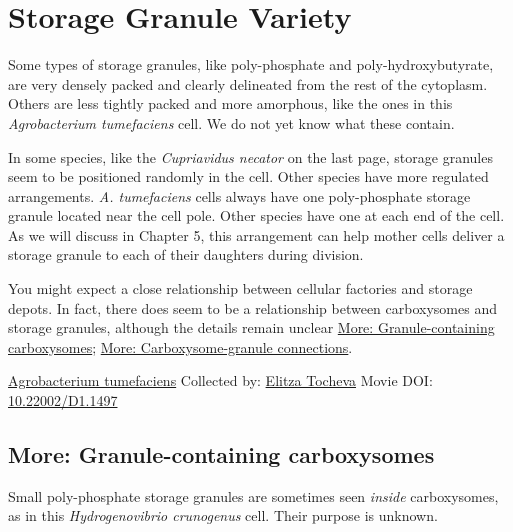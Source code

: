 \documentclass[]{tufte-book}
\begin{document}
\hypertarget{storage-granule-variety}{%
\section{Storage Granule Variety}\label{storage-granule-variety}}

Some types of storage granules, like poly-phosphate and poly-hydroxybutyrate, are very densely packed and clearly delineated from the rest of the cytoplasm. Others are less tightly packed and more amorphous, like the ones in this \emph{Agrobacterium tumefaciens} cell. We do not yet know what these contain.

In some species, like the \emph{Cupriavidus necator} on the last page, storage granules seem to be positioned randomly in the cell. Other species have more regulated arrangements. \emph{A. tumefaciens} cells always have one poly-phosphate storage granule located near the cell pole. Other species have one at each end of the cell. As we will discuss in Chapter 5, this arrangement can help mother cells deliver a storage granule to each of their daughters during division.

You might expect a close relationship between cellular factories and storage depots. In fact, there does seem to be a relationship between carboxysomes and storage granules, although the details remain unclear \protect\hyperlink{Granule-containing_carboxysomes}{More: Granule-containing carboxysomes}; \protect\hyperlink{Carboxysome-granule_connections}{More: Carboxysome-granule connections}.



\hypertarget{htmlwidget-04189289d62ad39fd099}{}

\label{fig:4-9}\protect\hyperlink{tree}{Agrobacterium tumefaciens} Collected by: \protect\hyperlink{elitza_tocheva}{Elitza Tocheva} Movie DOI: \href{https://doi.org/10.22002/D1.1497}{10.22002/D1.1497}

\hypertarget{Granule-containing_carboxysomes}{%
\subsection*{More: Granule-containing carboxysomes}\label{Granule-containing_carboxysomes}}

Small poly-phosphate storage granules are sometimes seen \emph{inside} carboxysomes, as in this \emph{Hydrogenovibrio crunogenus} cell. Their purpose is unknown.
\end{document}
